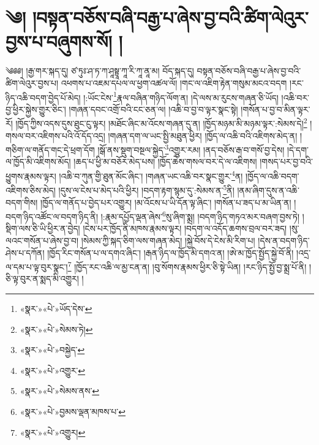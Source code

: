 \chapter{༄། །བསྟན་བཅོས་བཞི་བརྒྱ་པ་ཞེས་བྱ་བའི་ཚིག་ལེའུར་བྱས་པ་བཞུགས་སོ། །}༄༅༅། །རྒྱ་གར་སྐད་དུ། ཙ་ཏུཿ་ཤ་ཏ་ཀ་ཤཱསྟྲཱ་ཀཱ་རི་ཀཱ་ནཱ་མ། བོད་སྐད་དུ། བསྟན་བཅོས་བཞི་བརྒྱ་པ་ཞེས་བྱ་བའི་ཚིག་ལེའུར་བྱས་པ། འཕགས་པ་འཇམ་དཔལ་ལ་ཕྱག་འཚལ་ལོ། །གང་ལ་འཇིག་རྟེན་གསུམ་མངའ་བདག །རང་ཉིད་འཆི་བདག་བྱེད་པོ་མེད། །:ཡོང་ངེས་\footnote{«སྣར་»«པེ་»ཡོད་དེས་}རྣལ་བཞིན་གཉིད་ལོག་ན། །དེ་ལས་མ་རུངས་གཞན་ཅི་ཡོད། །འཆི་བར་བྱ་ཕྱིར་སྐྱེས་གྱུར་ཅིང་། །གཞན་དབང་འགྲོ་བའི་ངང་ཅན་ལ། །འཆི་བ་བྱ་བ་ལྟར་སྣང་སྟེ། །གསོན་པ་བྱ་བ་མིན་ལྟར་རོ། །ཁྱོད་ཀྱིས་འདས་དུས་ཐུང་ངུ་ལྟར། །མཐོང་ཞིང་མ་འོངས་གཞན་དུ་ན། །ཁྱོད་མཉམ་མི་མཉམ་ལྟར་:སེམས་དེ།\footnote{«སྣར་»«པེ་»སེམས་ཏེ།} །གསལ་བར་འཇིགས་པའི་འོ་དོད་འདྲ། །གཞན་དག་ལ་ཡང་སྤྱི་མཐུན་ཕྱིར། །ཁྱོད་ལ་འཆི་བའི་འཇིགས་མེད་ན། །གཅིག་ལ་གནོད་གང་དེ་ཕྲག་དོག །སྒོ་ནས་སྡུག་བསྔལ་སྐྱེད་\footnote{«སྣར་»«པེ་»བསྐྱེད་}འགྱུར་རམ། །ནད་བཅོས་རྒ་བ་གསོ་བྱ་དེས། །དེ་དག་ལ་ཁྱོད་མི་འཇིགས་མོད། །ཆད་པ་ཕྱི་མ་བཅོར་མེད་པས། །ཁྱོད་ཆེས་གསལ་བར་དེ་ལ་འཇིགས། །གསད་པར་བྱ་བའི་ཕྱུགས་རྣམས་ལྟར། །འཆི་བ་ཀུན་གྱི་ཐུན་མོང་ཞིང་། །གཞན་ཡང་འཆི་བར་སྣང་གྱུར་\footnote{«སྣར་»«པེ་»འགྱུར་}ན། །ཁྱོད་ལ་འཆི་བདག་འཇིགས་ཅིས་མེད། །དུས་ལ་ངེས་པ་མེད་པའི་ཕྱིར། །བདག་རྟག་སྙམ་དུ་:སེམས་ན་\footnote{«སྣར་»«པེ་»སེམས་ནས་}ནི། །ནམ་ཞིག་དུས་ན་འཆི་བདག་གིས། །ཁྱོད་ལ་གནོད་པ་བྱེད་པར་འགྱུར། །མ་འོངས་པ་ཡི་དོན་ལྟ་ཞིང་། །གསོན་པ་ཟད་པ་མ་ཡིན་ན། །བདག་ཉིད་འཚོང་ལ་བདག་ཉིད་ནི། །:རྣམ་དཔྱོད་ལྡན་ཞེས་\footnote{«སྣར་»«པེ་»བྱམས་ལྡན་མཁས་པ་}སུ་ཞིག་སྨྲ། །བདག་ཉིད་གཏའ་མར་བཞག་བྱས་ཏེ། །སྡིག་ལས་ཅི་ཡི་ཕྱིར་ན་བྱེད། །ངེས་པར་ཁྱོད་ནི་མཁས་རྣམས་ལྟར། །བདག་ལ་འདོད་ཆགས་བྲལ་བར་ཟད། །སུ་ལའང་གསོན་པ་ཞེས་བྱ་བ། །སེམས་ཀྱི་སྐད་ཅིག་ལས་གཞན་མེད། །སྐྱེ་བོས་དེ་ངེས་མི་རིག་པ། །དེས་ན་བདག་ཉིད་ཤེས་པ་དཀོན། །ཁྱོད་རིང་གསོན་པ་ལ་དགའ་ཞིང་། །རྒན་ཉིད་ལ་ཁྱོད་མི་དགའ་ན། །ཨེ་མ་ཁྱོད་སྤྱོད་སྐྱེ་བོ་ནི། །འདྲ་ལ་དམ་པ་ལྟ་བུར་སྣང་།\footnote{«སྣར་»«པེ་»འགྱུར།} །ཁྱོད་རང་འཆི་ལ་མྱ་ངན་ན། །བུ་སོགས་རྣམས་ཕྱིར་ཅི་སྟེ་ཡིན། །རང་ཉིད་སྤྱོ་བྱ་སྨྲ་པོ་ནི། །ཅི་ལྟ་བུར་ན་སྨད་མི་འགྱུར། །
